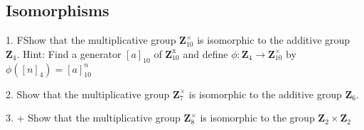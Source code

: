 \subsection{Isomorphisms}
\begin{mdframed}[style=darkQuesion]
  1. FShow that the multiplicative group $\mathbf{Z}_{10}^{\times}$ is isomorphic to the additive group $\mathbf{Z}_{4}$. Hint: Find a generator $[a]_{10}$ of $\mathbf{Z}_{10}^{\mathrm{x}}$ and define $\phi: \mathbf{Z}_{4} \rightarrow \mathbf{Z}_{10}^{\times}$ by $\phi\left([n]_{4}\right)=[a]_{10}^{n}$
\end{mdframed}
\begin{mdframed}[style=darkAnswer,frametitle={Joe Starr}]
\end{mdframed}
\newpage
\begin{mdframed}[style=darkQuesion]
  2. Show that the multiplicative group $\mathbf{Z}_{7}^{\times}$ is isomorphic to the additive group $\mathbf{Z}_{6}$.
\end{mdframed}
\begin{mdframed}[style=darkAnswer,frametitle={Joe Starr}]
\end{mdframed}
\newpage
\begin{mdframed}[style=darkQuesion]
  3. $+$ Show that the multiplicative group $\mathbf{Z}_{8}^{\times}$ is isomorphic to the group $\mathbf{Z}_{2} \times \mathbf{Z}_{2}$
\end{mdframed}
